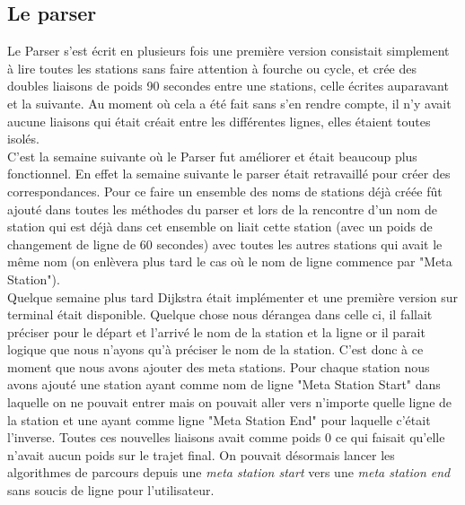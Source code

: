 \documentclass[french, 12pt]{article}
\begin{document}
\subsection{Le parser}
Le Parser s'est écrit en plusieurs fois une première version consistait simplement à lire toutes les stations sans faire attention à fourche ou cycle, et crée des doubles liaisons de poids 90 secondes entre une stations, celle écrites auparavant et la suivante. Au moment où cela a été fait sans s'en rendre compte, il n'y avait aucune liaisons qui était créait entre les différentes lignes, elles étaient toutes isolés.\\
C'est la semaine suivante où le Parser fut améliorer et était beaucoup plus fonctionnel. En effet la semaine suivante le parser était retravaillé pour créer des correspondances. Pour ce faire un ensemble des noms de stations déjà créée fût ajouté dans toutes les méthodes du parser et lors de la rencontre d'un nom de station qui est déjà dans cet ensemble on liait cette station (avec un poids de changement de ligne de 60 secondes) avec toutes les autres stations qui avait le même nom (on enlèvera plus tard le cas où le nom de ligne commence par "Meta Station"). \\
Quelque semaine plus tard Dijkstra était implémenter et une première version sur terminal était disponible. Quelque chose nous dérangea dans celle ci, il fallait préciser pour le départ et l'arrivé le nom de la station et la ligne or il parait logique que nous n'ayons qu'à préciser le nom de la station. C'est donc à ce moment que nous avons ajouter des meta stations. Pour chaque station nous avons ajouté une station ayant comme nom de ligne "Meta Station Start" dans laquelle on ne pouvait entrer mais on pouvait aller vers n'importe quelle ligne de la station et une ayant comme ligne "Meta Station End" pour laquelle c'était l'inverse. Toutes ces nouvelles liaisons avait comme poids 0 ce qui faisait qu'elle n'avait aucun poids sur le trajet final. On pouvait désormais lancer les algorithmes de parcours depuis une \emph{meta station start} vers une \emph{meta station end} sans soucis de ligne pour l'utilisateur. \\
\end{document}
